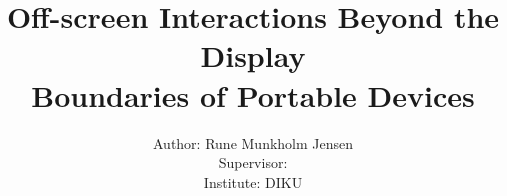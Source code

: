 
\title{
	Off-screen Interactions Beyond the Display \\Boundaries of Portable Devices\\}
	\author{
		Author: Rune Munkholm Jensen\\
		Supervisor: \\%
		Institute: DIKU\\
	}


\thispagestyle{empty}

\renewenvironment{abstract}
{\small
	\begin{center}
		\bfseries \abstractname\vspace{0cm}\vspace{0pt}
	\end{center}
	\list{}{%
		\setlength{\leftmargin}{4.78cm}%
		\setlength{\rightmargin}{\leftmargin}%
	}%
	\item\relax}
{\endlist}

\hspace{5cm}


